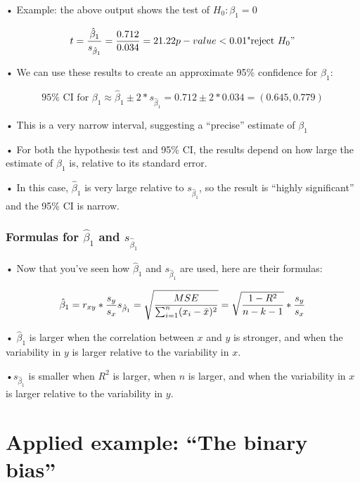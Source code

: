 \documentclass[
  letterpaper,
  DIV=11,
  numbers=noendperiod]{scrreprt}
\begin{document}
• Example: the above output shows the test of \(H_0: \beta_1 = 0\)

\[
t = \frac{\hat{\beta}_1}{s_{\hat{\beta}_1}} = \frac{0.712}{0.034} = 21.22\\
p-value < 0.01 \\
\text{"reject } H_0"
\]

• We can use these results to create an approximate 95\% confidence for
\(\beta_1\):

\[
95\% \text{ CI for } \beta_1 \approx \hat{\beta}_1 \pm 2* s_{\hat{\beta}_1} = 0.712 \pm 2*0.034 = (0.645,0.779)
\]

• This is a very narrow interval, suggesting a ``precise'' estimate of
\(\beta_1\)

• For both the hypothesis test and 95\% CI, the results depend on how
large the estimate of \(\beta_1\) is, relative to its standard error.

• In this case, \(\hat{\beta}_1\) is very large relative to
\(s_{\hat{\beta}_1}\), so the result is ``highly significant'' and the
95\% CI is narrow.

\hypertarget{formulas-for-hatbeta_1-and-s_hatbeta_1}{%
\subsubsection{\texorpdfstring{Formulas for \(\hat{\beta}_1\) and
\(s_{\hat{\beta}_1}\)}{Formulas for \textbackslash hat\{\textbackslash beta\}\_1 and s\_\{\textbackslash hat\{\textbackslash beta\}\_1\}}}\label{formulas-for-hatbeta_1-and-s_hatbeta_1}}

• Now that you've seen how \(\hat{\beta}_1\) and \(s_{\hat{\beta}_1}\)
are used, here are their formulas:

\[
\hat{\beta}_1 = r_{xy} * \frac{s_y}{s_x} \\
s_{\hat{\beta}_1} = \sqrt{\frac{MSE}{\sum^n_{i=1}(x_i - \bar{x})^2}} = \sqrt{\frac{1-R^2}{n-k-1}}*\frac{s_y}{s_x}
\]

• \(\hat{\beta}_1\) is larger when the correlation between \(x\) and
\(y\) is stronger, and when the variability in \(y\) is larger relative
to the variability in \(x\).

•\(s_{\hat{\beta}_1}\) is smaller when \(R^2\) is larger, when \(n\) is
larger, and when the variability in \(x\) is larger relative to the
variability in \(y\).

\hypertarget{applied-example-the-binary-bias}{%
\section{Applied example: ``The binary
bias''}\label{applied-example-the-binary-bias}}
\end{document}
